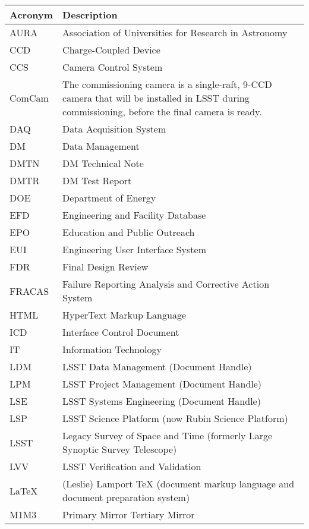 \addtocounter{table}{-1}
\begin{longtable}{p{}p{}}\hline
\textbf{Acronym} & \textbf{Description}  \\\hline

AURA & Association of Universities for Research in Astronomy \\\hline
CCD & Charge-Coupled Device \\\hline
CCS & Camera Control System \\\hline
ComCam & The commissioning camera is a single-raft, 9-CCD camera that will be installed in LSST during commissioning, before the final camera is ready. \\\hline
DAQ & Data Acquisition System \\\hline
DM & Data Management \\\hline
DMTN & DM Technical Note \\\hline
DMTR & DM Test Report \\\hline
DOE & Department of Energy \\\hline
EFD & Engineering and Facility Database \\\hline
EPO & Education and Public Outreach \\\hline
EUI & Engineering User Interface System \\\hline
FDR & Final Design Review \\\hline
FRACAS & Failure Reporting Analysis and Corrective Action System \\\hline
HTML & HyperText Markup Language \\\hline
ICD & Interface Control Document \\\hline
IT & Information Technology \\\hline
LDM & LSST Data Management (Document Handle) \\\hline
LPM & LSST Project Management (Document Handle) \\\hline
LSE & LSST Systems Engineering (Document Handle) \\\hline
LSP & LSST Science Platform (now Rubin Science Platform) \\\hline
LSST & Legacy Survey of Space and Time (formerly Large Synoptic Survey Telescope) \\\hline
LVV & LSST Verification and Validation \\\hline
LaTeX & (Leslie) Lamport TeX (document markup language and document preparation system) \\\hline
M1M3 & Primary Mirror Tertiary Mirror \\\hline

\end{longtable}

